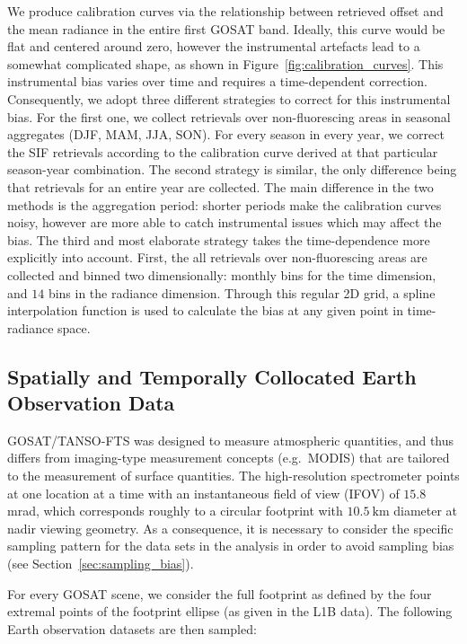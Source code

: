 \documentclass[preprint, a4paper, 10pt, times, 5p]{elsarticle}
\begin{document}
We produce calibration curves via the relationship between retrieved offset and the mean radiance in the entire first GOSAT band. Ideally, this curve would be flat and centered around zero, however the instrumental artefacts lead to a somewhat complicated shape, as shown in Figure~\ref{fig:calibration_curves}. This instrumental bias varies over time and requires a time-dependent correction. Consequently, we adopt three different strategies to correct for this instrumental bias. For the first one, we collect retrievals over non-fluorescing areas in seasonal aggregates (DJF, MAM, JJA, SON). For every season in every year, we correct the SIF retrievals according to the calibration curve derived at that particular season-year combination. The second strategy is similar, the only difference being that retrievals for an entire year are collected. The main difference in the two methods is the aggregation period: shorter periods make the calibration curves noisy, however are more able to catch instrumental issues which may affect the bias. The third and most elaborate strategy takes the time-dependence more explicitly into account. First, the all retrievals over non-fluorescing areas are collected and binned two dimensionally: monthly bins for the time dimension, and $14$ bins in the radiance dimension. Through this regular 2D grid, a spline interpolation function is used to calculate the bias at any given point in time-radiance space.  


\subsection{Spatially and Temporally Collocated Earth Observation Data}
\label{sec:collocation}

GOSAT/TANSO-FTS was designed to measure atmospheric quantities, and thus differs from imaging-type measurement concepts (e.g.~MODIS) that are tailored to the measurement of surface quantities. The high-resolution spectrometer points at one location at a time with an instantaneous field of view (IFOV) of $15.8$ mrad, which corresponds roughly to a circular footprint with $10.5\:\mathrm{km}$ diameter at nadir viewing geometry. As a consequence, it is necessary to consider the specific sampling pattern for the data sets in the analysis in order to avoid sampling bias (see Section~\ref{sec:sampling_bias}).

For every GOSAT scene, we consider the full footprint as defined by the four extremal points of the footprint ellipse (as given in the L1B data). The following Earth observation datasets are then sampled:
\end{document}
